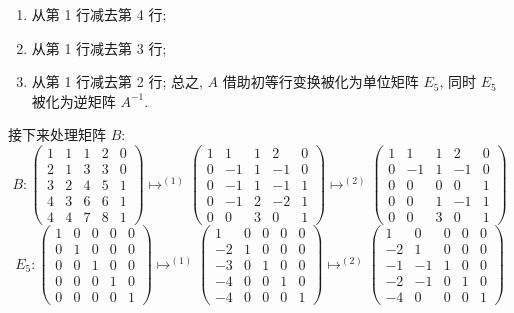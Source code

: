 \begin{enumerate}
\item[(6)] 从第 1 行减去第 4 行;
\item[(7)] 从第 1 行减去第 3 行;
\item[(8)] 从第 1 行减去第 2 行; 总之, $A$ 借助初等行变换被化为单位矩阵 $E_5$, 同时 $E_5$
被化为逆矩阵 $A^{-1}$.
\end{enumerate}

接下来处理矩阵 $B$:
\[
B \colon \begin{pmatrix} 1 & 1 & 1 & 2 & 0 \\ 2 & 1 & 3 & 3 & 0 \\ 3 & 2 & 4 & 5 & 1 \\ 4 & 3 & 6 & 6 & 1 \\ 4 & 4 & 7 & 8 & 1 \end{pmatrix}
\longmapsto^{(1)} \begin{pmatrix} 1 & 1 & 1 & 2 & 0 \\ 0 & -1 & 1 & -1 & 0 \\ 0 & -1 & 1 & -1 & 1 \\ 0 & -1 & 2 & -2 & 1 \\ 0 & 0 & 3 & 0 & 1 \end{pmatrix}
\longmapsto^{(2)} \begin{pmatrix} 1 & 1 & 1 & 2 & 0 \\ 0 & -1 & 1 & -1 & 0 \\ 0 & 0 & 0 & 0 & 1 \\ 0 & 0 & 1 & -1 & 1 \\ 0 & 0 & 3 & 0 & 1 \end{pmatrix}
\]
\[
E_5 \colon \begin{pmatrix} 1 & 0 & 0 & 0 & 0 \\ 0 & 1 & 0 & 0 & 0 \\ 0 & 0 & 1 & 0 & 0 \\ 0 & 0 & 0 & 1 & 0 \\ 0 & 0 & 0 & 0 & 1 \end{pmatrix}
\longmapsto^{(1)} \begin{pmatrix} 1 & 0 & 0 & 0 & 0 \\ -2 & 1 & 0 & 0 & 0 \\ -3 & 0 & 1 & 0 & 0 \\ -4 & 0 & 0 & 1 & 0 \\ -4 & 0 & 0 & 0 & 1 \end{pmatrix}
\longmapsto^{(2)} \begin{pmatrix} 1 & 0 & 0 & 0 & 0 \\ -2 & 1 & 0 & 0 & 0 \\ -1 & -1 & 1 & 0 & 0 \\ -2 & -1 & 0 & 1 & 0 \\ -4 & 0 & 0 & 0 & 1 \end{pmatrix}
\]
